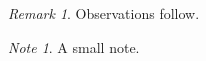 \documentclass{article}
\theoremstyle{remark}
\newtheorem*{remark}{Remark}
\newtheorem*{note}{Note}
\begin{document}
\begin{remark}
Observations follow.
\end{remark}
\begin{note}
A small note.
\end{note}
\end{document}
